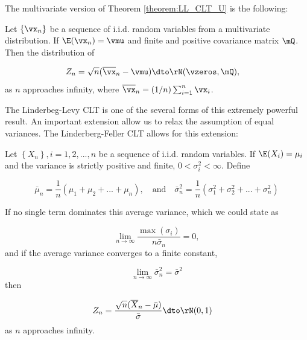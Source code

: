 \documentclass[english,12pt]{book}\usepackage[]{graphicx}\usepackage[]{xcolor}
\begin{document}
The multivariate version of Theorem \ref{theorem:LL_CLT_U} is the following:


\begin{theorem}\label{theorem:LL_CLT_M}
Let $\left\lbrace \vx_n \right\rbrace$ be a sequence of i.i.d. random variables from a multivariate distribution. If $\E(\vx_n) = \vmu$ and finite and positive covariance matrix $\mQ$. Then the distribution of

\begin{equation*}
  \begin{aligned}
      Z_n & = \sqrt{n}(\overline{\vx}_n - \vmu) \dto \rN(\vzeros, \mQ), 
  \end{aligned}
\end{equation*}
%
as $n$ approaches infinity, where $\overline{\vx}_n = (1 / n)\sum_{i = 1}^n\vx_i$.
\end{theorem}

The Linderbeg-Levy CLT is one of the several forms of this extremely powerful result. An important extension allow us to relax the assumption of equal variances. The Linderberg-Feller CLT allows for this extension:

\begin{theorem}\label{theorem:LF_CLT_U}
Let $\left\lbrace X_n\right\rbrace, i = 1, 2,...,n$ be a sequence of i.i.d. random variables. If $\E(X_i) = \mu_i$ and the variance is strictly positive and finite, $0 < \sigma^2_i < \infty$. Define 

\begin{equation*}
  \bar{\mu}_n = \frac{1}{n}(\mu_1 + \mu_2 + ... +\mu_n), \quad \mbox{and} \quad \bar{\sigma}^2_n =\frac{1}{n}(\sigma^2_1 + \sigma^2_2 + ... +\sigma^2_n)
\end{equation*}

If no single term dominates this average variance, which we could state as

\begin{equation*}
\lim_{n\to \infty} \frac{\max (\sigma_i)}{n \bar{\sigma}_n} = 0,
\end{equation*}
%
and if the average variance converges to a finite constant,

\begin{equation*}
\lim_{n\to \infty} \bar{\sigma}^2_n = \bar{\sigma}^2
\end{equation*}
%
then

\begin{equation*}
  \begin{aligned}
      Z_n &  = \frac{\sqrt{n}(\overline{X}_n - \bar{\mu})}{\bar{\sigma}} \dto \rN(0, 1)
  \end{aligned}
\end{equation*}
%
 as $n$ approaches infinity.
\end{theorem}
\end{document}
